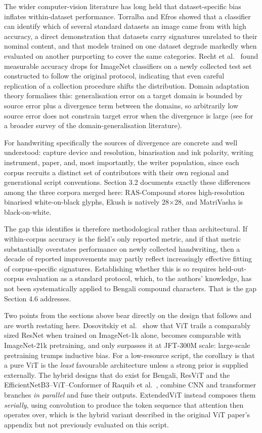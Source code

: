 The wider computer-vision literature has long held that dataset-specific
bias inflates within-dataset performance. Torralba and Efros \citeyearpar{ref45}
showed that a classifier can identify which of several standard datasets
an image came from with high accuracy, a direct demonstration that
datasets carry signatures unrelated to their nominal content, and
that models trained on one dataset degrade markedly when evaluated on
another purporting to cover the same categories. Recht et al.~\citeyearpar{ref46}
found measurable accuracy drops for ImageNet classifiers on a newly
collected test set constructed to follow the original protocol,
indicating that even careful replication of a collection procedure
shifts the distribution. Domain adaptation theory \citep{ref47} formalises
this: generalisation error on a target domain is bounded by source error
plus a divergence term between the domains, so arbitrarily low source
error does not constrain target error when the divergence is large (see
\citep{ref57} for a broader survey of the domain-generalisation
literature).

For handwriting specifically the sources of divergence are concrete and
well understood: capture device and resolution, binarisation and ink
polarity, writing instrument, paper, and, most importantly, the
writer population, since each corpus recruits a distinct set of
contributors with their own regional and generational script
conventions. Section 3.2 documents exactly these differences among the
three corpora merged here: RAS-Compound stores high-resolution binarised
white-on-black glyphs, Ekush is natively 28×28, and MatriVasha is
black-on-white.

The gap this identifies is therefore methodological rather than
architectural. If within-corpus accuracy is the field's only reported
metric, and if that metric substantially overstates performance on newly
collected handwriting, then a decade of reported improvements may partly
reflect increasingly effective fitting of corpus-specific signatures.
Establishing whether this is so requires held-out-corpus evaluation as a
standard protocol, which, to the authors' knowledge, has not been
systematically applied to Bengali compound characters. That is the gap
Section 4.6 addresses.

Two points from the sections above bear directly on the design that
follows and are worth restating here. Dosovitskiy et al.~\citeyearpar{ref22} show
that ViT trails a comparably sized ResNet when trained on ImageNet-1k
alone, becomes comparable with ImageNet-21k pretraining, and only
surpasses it at JFT-300M scale: large-scale pretraining trumps
inductive bias. For a low-resource script, the corollary is that a pure
ViT is the \emph{least} favourable architecture unless a strong prior is
supplied externally. The hybrid designs that do exist for Bengali,
ResViT \citep{ref19} and the EfficientNetB3--ViT--Conformer of Raquib et
al.~\citeyearpar{ref25}, combine CNN and transformer branches \emph{in parallel}
and fuse their outputs. ExtendedViT instead composes them
\emph{serially}, using convolution to produce the token sequence that
attention then operates over, which is the hybrid variant described in
the original ViT paper's appendix but not previously evaluated on this
script.


